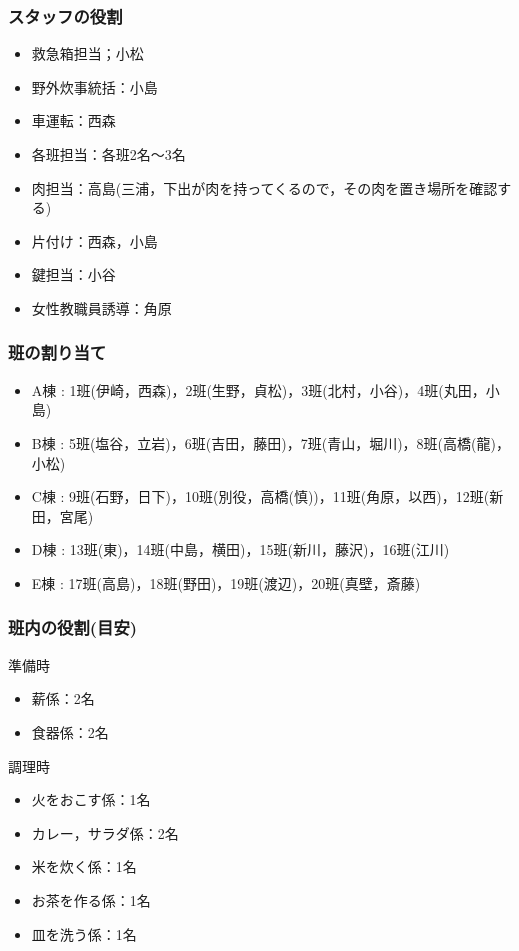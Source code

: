 \subsubsection{スタッフの役割}
\begin{itemize}
  \item 救急箱担当；小松
  \item 野外炊事統括：小島
  \item 車運転：西森
  \item 各班担当：各班2名〜3名
  \item 肉担当：高島(三浦，下出が肉を持ってくるので，その肉を置き場所を確認する)
　\item 片付け：西森，小島
  \item 鍵担当：小谷
  \item 女性教職員誘導：角原
\end{itemize}

\subsubsection{班の割り当て}
\begin{itemize}
 \item A棟 : 1班(伊崎，西森)，2班(生野，貞松)，3班(北村，小谷)，4班(丸田，小島)
 \item B棟 : 5班(塩谷，立岩)，6班(吉田，藤田)，7班(青山，堀川)，8班(高橋(龍)，小松)
 \item C棟 : 9班(石野，日下)，10班(別役，高橋(慎))，11班(角原，以西)，12班(新田，宮尾)
 \item D棟 : 13班(東)，14班(中島，横田)，15班(新川，藤沢)，16班(江川)
 \item E棟 : 17班(高島)，18班(野田)，19班(渡辺)，20班(真壁，斎藤)
\end{itemize}

\subsubsection{班内の役割(目安)}

準備時
\begin{itemize}
  \item 薪係：2名
  \item 食器係：2名
\end{itemize}

調理時
\begin{itemize}
  \item 火をおこす係：1名
  \item カレー，サラダ係：2名
  \item 米を炊く係：1名
  \item お茶を作る係：1名
  \item 皿を洗う係：1名
\end{itemize}


